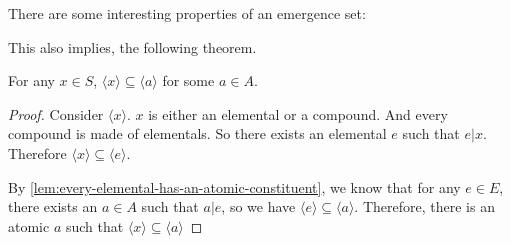 There are some interesting properties of an emergence set: 










This also implies, the following theorem. 
\begin{theorem}\label{thm:every-hai-set-is-a-subset-of-a-hai-set-whose-head-is-atomic}
    For any $x\in S$, $\langle x \rangle \subseteq \langle a \rangle$ for some $a\in A$.
\end{theorem}
\begin{proof}
    Consider $\langle x \rangle$. $x$ is either an elemental or a compound. And every compound is made of elementals. So there exists an elemental $e$ such that $e|x$. Therefore $\langle x \rangle \subseteq \langle e \rangle$. 
    
    By \ref{lem:every-elemental-has-an-atomic-constituent}, we know that for any $e \in E$, there exists an $a \in A$ such that $a|e$, so we have $\langle e \rangle \subseteq \langle a \rangle$. Therefore, there is an atomic $a$ such that $\langle x \rangle \subseteq \langle a \rangle$
    
\end{proof}


